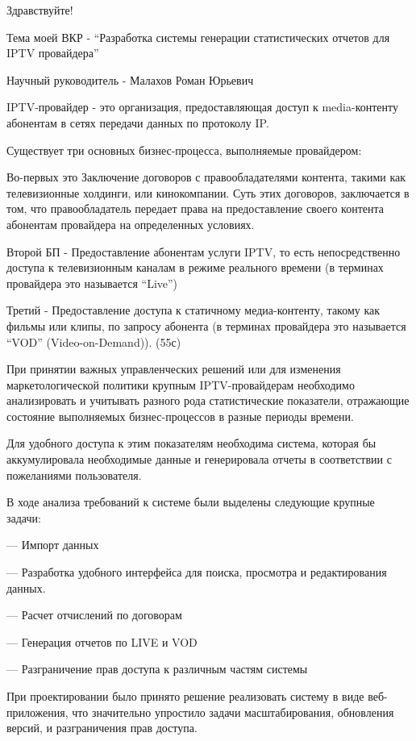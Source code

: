 \documentclass[a4paper]{article}
\begin{document}
\huge
\newpage

Здравствуйте!

Тема моей ВКР - “Разработка системы генерации статистических отчетов для IPTV провайдера”

Научный руководитель - Малахов Роман Юрьевич

\newpage
IPTV-провайдер - это организация, предоставляющая доступ к media-контенту абонентам в сетях передачи данных по протоколу IP.

Существует три основных бизнес-процесса, выполняемые провайдером:

Во-первых это Заключение договоров с правообладателями контента, такими как телевизионные холдинги, или кинокомпании. Суть этих договоров, заключается в том, что правообладатель передает права на предоставление своего контента абонентам провайдера на определенных условиях.

Второй БП -  Предоставление абонентам услуги IPTV, то есть непосредственно доступа к телевизионным каналам в режиме реального времени (в терминах провайдера это называется “Live”)

Третий - Предоставление доступа к статичному медиа-контенту, такому как фильмы или клипы, по запросу абонента (в терминах провайдера это называется “VOD” (Video-on-Demand)).
(55с)

\newpage

При принятии важных управленческих решений или для изменения маркетологической политики крупным IPTV-провайдерам необходимо анализировать и учитывать разного рода статистические показатели, отражающие состояние выполняемых бизнес-процессов в разные периоды времени.

Для удобного доступа к этим показателям необходима система, которая бы аккумулировала необходимые данные и генерировала отчеты в соответствии с пожеланиями пользователя.

В ходе анализа требований к системе были выделены следующие крупные задачи:

--- Импорт данных

--- Разработка удобного интерфейса для поиска, просмотра и редактирования данных.

---  Расчет отчислений по договорам

--- Генерация отчетов по LIVE и VOD

---  Разграничение прав доступа к различным частям системы

\newpage

При проектировании было принято решение реализовать систему в виде веб-приложения, 
что значительно упростило задачи масштабирования, обновления версий, и разграничения прав доступа.
\end{document}
